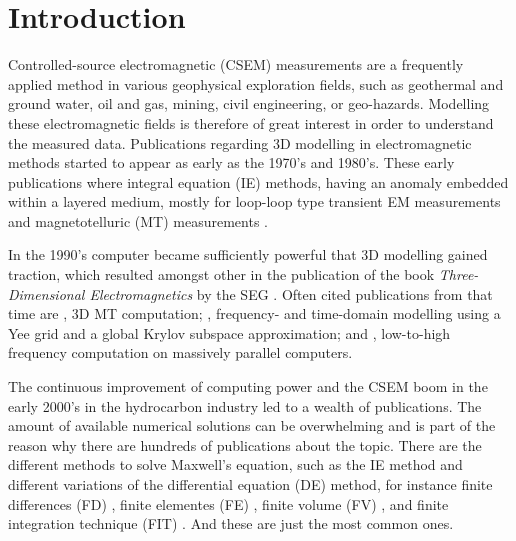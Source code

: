 \documentclass[
    paper,
  ]{geophysics}
\begin{document}
\section{Introduction}

Controlled-source electromagnetic (CSEM) measurements are a frequently applied
method in various geophysical exploration fields, such as geothermal and ground
water, oil and gas, mining, civil engineering, or geo-hazards. Modelling these
electromagnetic fields is therefore of great interest in order to understand
the measured data. Publications regarding 3D modelling in electromagnetic
methods started to appear as early as the 1970's and 1980's. These early
publications where integral equation (IE) methods, having an anomaly embedded
within a layered medium, mostly for loop-loop type transient EM measurements
\citep{GJI.74.Raiche, GEO.75.Hohmann, GJI.82.Das, GEO.86.Newman} and
magnetotelluric (MT) measurements \citep{GEO.84.Wannamaker}.

In the 1990's computer became sufficiently powerful that 3D modelling gained
traction, which resulted amongst other in the publication of the book
\emph{Three-Dimensional Electromagnetics} by the SEG
\citep{B.SEG.99.Oristaglio}. Often cited publications from that time are
\cite{RSC.94.Mackie}, 3D MT computation; \cite{RS.94.Druskin}, frequency- and
time-domain modelling using a Yee grid and a global Krylov subspace
approximation; and \cite{RS.96.Alumbaugh, GJI.97.Newman}, low-to-high frequency
computation on massively parallel computers.

The continuous improvement of computing power and the CSEM boom in the early
2000's in the hydrocarbon industry led to a wealth of publications. The amount
of available numerical solutions can be overwhelming and is part of the reason
why there are hundreds of publications about the topic. There are the different
methods to solve Maxwell's equation, such as the IE method
\citep{GJI.74.Raiche, RS.02.Hursan, GEO.06.Zhdanov, GP.10.Tehrani,
CAG.16.Kruglyakov, MGS.17.Kruglyakov} and different variations of the
differential equation (DE) method, for instance finite differences (FD)
\citep{IEEE.66.Yee, GEO.93.Wang, RSC.94.Mackie, RS.94.Druskin, GEO.09.Streich,
CAG.13.Sommer}, finite elementes (FE) \citep{GJI.11.Schwarzbach, GEO.04.Commer,
GEO.12.daSilva, GJI.13.Puzyrev, GJI.13.Grayver, SEG.16.Zhang}, finite volume
(FV) \citep{EM.90.Madsen, ECP.07.Haber, GEO.14.Jahandari}, and finite
integration technique (FIT) \citep{PIER.01.Clemens, GP.06.Mulder}. And these
are just the most common ones.
\end{document}

